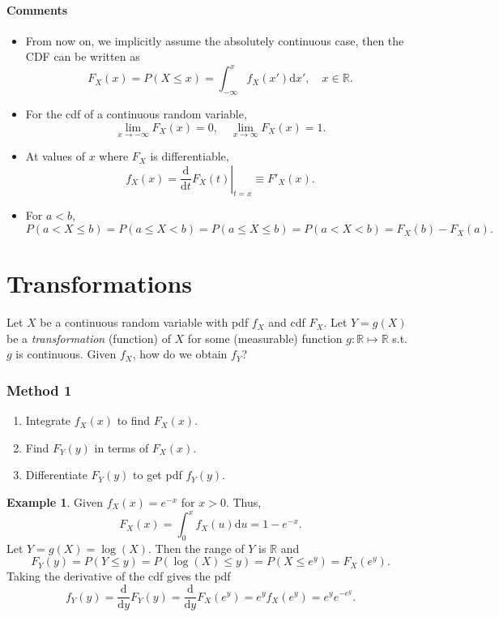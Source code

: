 \documentclass[12pt]{report}
\theoremstyle{definition}
\begin{document}
\paragraph{Comments}
\begin{itemize}
    \item 
        From now on, we implicitly assume the absolutely continuous case, then the CDF
        can be written as
        \[
            F_X(x)=P(X\le x)=\int_{-\infty}^{x} f_X(x')\mathrm{d}x',\quad
            x\in\mathbb{R}.
        \]
    \item For the cdf of a continuous random variable,
        \[
            \lim_{x\rightarrow-\infty}F_X(x)=0,\quad
            \lim_{x\rightarrow\infty}F_X(x)=1.
        \]
    \item At values of $x$ where $F_X$ is differentiable,
        \[
            f_X(x)=\left.\frac{\mathrm{d}}{\mathrm{d}t}F_X(t)\right\vert_{t=x}\equiv
            F'_X(x).
        \]
    \item For $a<b$,
        \[
            P(a<X\le b)=P(a\le X<b)=P(a\le X\le b)=P(a<X<b)=F_X(b)-F_X(a).
        \]
\end{itemize} 

\section{Transformations}

Let $X$ be a continuous random variable with pdf $f_X$ and cdf $F_X$.
Let $Y=g(X)$ be a \emph{transformation} (function) of $X$ for some (measurable) 
function $g:\mathbb{R}\mapsto\mathbb{R}$ s.t. $g$ is continuous.
Given $f_X$, how do we obtain $f_Y$?

\subsubsection{Method 1}
\begin{enumerate}
    \item Integrate $f_X(x)$ to find $F_X(x)$.
    \item Find $F_Y(y)$ in terms of $F_X(x)$.
    \item Differentiate $F_Y(y)$ to get pdf $f_Y(y)$.
\end{enumerate} 
\newtheorem{transform via cdf}[theorem]{Example}
\begin{transform via cdf}
    Given $f_X(x)=e^{-x}$ for $x>0$. Thus,
    \[
        F_X(x)=\int_{0}^{x} f_X(u)\mathrm{d}u=1-e^{-x}.
    \]
    Let $Y=g(X)=\log(X)$. Then the range of $Y$ is $\mathbb{R}$ and
    \[
        F_Y(y)=P(Y\le y)=P(\log(X)\le y)=P(X\le e^{y})=F_X(e^y).
    \]
    Taking the derivative of the cdf gives the pdf
    \[
        f_Y(y)=\frac{\mathrm{d}}{\mathrm{d}y}F_Y(y)
        =\frac{\mathrm{d}}{\mathrm{d}y}F_X(e^{y})
        =e^{y}f_X(e^{y})=e^{y}e^{-e^{y}}.
    \]
\end{transform via cdf}
\end{document}
